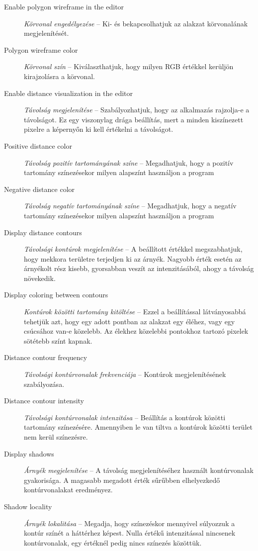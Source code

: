 \begin{description}
    \item[Enable polygon wireframe in the editor] \textit{Körvonal engedélyezése} -- Ki- és bekapcsolhatjuk az alakzat körvonalának megjelenítését.
    \item[Polygon wireframe color] \textit{Körvonal szín} -- Kiválaszthatjuk, hogy milyen RGB értékkel kerüljön kirajzolásra a körvonal.
    \item[Enable distance visualization in the editor] \textit{Távolság megjelenítése} -- Szabályozhatjuk, hogy az alkalmazás rajzolja-e a távolságot. Ez egy viszonylag drága beállítás, mert a minden kiszínezett pixelre a képernyőn ki kell értékelni a távolságot.
    \item[Positive distance color] \textit{Távolság pozitív tartományának színe} -- Megadhatjuk, hogy a pozitív tartomány színezésekor milyen alapszínt használjon a program
    \item[Negative distance color] \textit{Távolság negatív tartományának színe} -- Megadhatjuk, hogy a negatív tartomány színezésekor milyen alapszínt használjon a program
    \item[Display distance contours] \textit{Távolsági kontúrok megjelenítése} -- A beállított értékkel megszabhatjuk, hogy mekkora területre terjedjen ki az árnyék. Nagyobb érték esetén az árnyékolt rész kisebb, gyorsabban veszít az intenzitásából, ahogy a távolság növekedik.
    \item[Display coloring between contours] \textit{Kontúrok közötti tartomány kitöltése} -- Ezzel a beállítással látványosabbá tehetjük azt, hogy egy adott pontban az alakzat egy éléhez, vagy egy csúcsához van-e közelebb. Az élekhez közelebbi pontokhoz tartozó pixelek sötétebb színt kapnak.
    \item[Distance contour frequency] \textit{Távolsági kontúrvonalak frekvenciája} -- Kontúrok megjelenítésének szabályozása.
    \item[Distance contour intensity] \textit{Távolsági kontúrvonalak intenzitása} -- Beállítás a kontúrok közötti tartomány színezésére. Amennyiben le van tiltva a kontúrok közötti terület nem kerül színezésre.
    \item[Display shadows] \textit{Árnyék megjelenítése} -- A távolság megjelenítéséhez használt kontúrvonalak gyakorisága. A magasabb megadott érték sűrűbben elhelyezkedő kontúrvonalakat eredményez.
    \item[Shadow locality] \textit{Árnyék lokalitása} -- Megadja, hogy színezéskor mennyivel súlyozzuk a kontúr színét a háttérhez képest. Nulla értékű intenzitással nincsenek kontúrvonalak, egy értéknél pedig nincs színezés közöttük.

\end{description}
